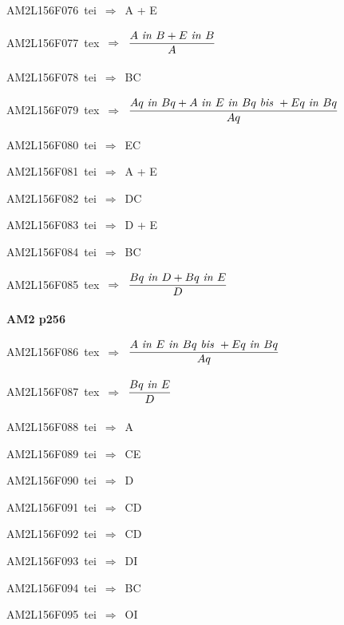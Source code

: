 {\sixrm AM2L156F076\ {\sixit tei}\ }$\Rightarrow$\ {\tenit A} + {\tenit E}\par\smallskip
{\sixrm AM2L156F077\ {\sixit tex}\ }$\Rightarrow$\ ${\displaystyle\strut {A \ {\it in}\  B + E \ {\it in}\  B}\over \displaystyle\strut A}$\par\smallskip
{\sixrm AM2L156F078\ {\sixit tei}\ }$\Rightarrow$\ BC\par\smallskip
{\sixrm AM2L156F079\ {\sixit tex}\ }$\Rightarrow$\ ${\displaystyle\strut {Aq \ {\it in}\  Bq + A \ {\it in}\  E \ {\it in}\  Bq \ {\it bis}\  + Eq \ {\it in}\  Bq}\over \displaystyle\strut Aq}$\par\smallskip
{\sixrm AM2L156F080\ {\sixit tei}\ }$\Rightarrow$\ EC\par\smallskip
{\sixrm AM2L156F081\ {\sixit tei}\ }$\Rightarrow$\ {\tenit A} + {\tenit E}\par\smallskip
{\sixrm AM2L156F082\ {\sixit tei}\ }$\Rightarrow$\ DC\par\smallskip
{\sixrm AM2L156F083\ {\sixit tei}\ }$\Rightarrow$\ {\tenit D} + {\tenit E}\par\smallskip
{\sixrm AM2L156F084\ {\sixit tei}\ }$\Rightarrow$\ BC\par\smallskip
{\sixrm AM2L156F085\ {\sixit tex}\ }$\Rightarrow$\ ${\displaystyle\strut {Bq \ {\it in}\  D + Bq \ {\it in}\  E}\over \displaystyle\strut D}$\par\smallskip

\par\vfill\eject
{\bf\hfill AM2 p256\hfill\hbox{}}\par\bigskip
{\sixrm AM2L156F086\ {\sixit tex}\ }$\Rightarrow$\ ${\displaystyle\strut {A \ {\it in}\  E \ {\it in}\  Bq \ {\it bis}\  + Eq \ {\it in}\  Bq}\over \displaystyle\strut Aq}$\par\smallskip
{\sixrm AM2L156F087\ {\sixit tex}\ }$\Rightarrow$\ ${\displaystyle\strut {Bq \ {\it in}\  E}\over \displaystyle\strut D}$\par\smallskip
{\sixrm AM2L156F088\ {\sixit tei}\ }$\Rightarrow$\ {\tenit A}\par\smallskip
{\sixrm AM2L156F089\ {\sixit tei}\ }$\Rightarrow$\ CE\par\smallskip
{\sixrm AM2L156F090\ {\sixit tei}\ }$\Rightarrow$\ {\tenit D}\par\smallskip
{\sixrm AM2L156F091\ {\sixit tei}\ }$\Rightarrow$\ CD\par\smallskip
{\sixrm AM2L156F092\ {\sixit tei}\ }$\Rightarrow$\ CD\par\smallskip
{\sixrm AM2L156F093\ {\sixit tei}\ }$\Rightarrow$\ DI\par\smallskip
{\sixrm AM2L156F094\ {\sixit tei}\ }$\Rightarrow$\ BC\par\smallskip
{\sixrm AM2L156F095\ {\sixit tei}\ }$\Rightarrow$\ OI\par\smallskip

